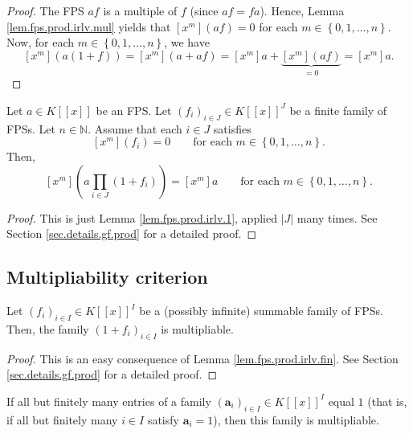 \begin{proof}
The FPS $af$ is a multiple of $f$ (since $af=fa$). Hence, Lemma
\ref{lem.fps.prod.irlv.mul} yields that
$\left[x^{m}\right]\left(af\right)=0$ for each
$m\in\left\{0,1,\ldots,n\right\}$.
Now, for each $m\in\left\{0,1,\ldots,n\right\}$, we have
\[
\left[x^{m}\right]\left(a\left(1+f\right)\right)
=\left[x^{m}\right]\left(a+af\right)
=\left[x^{m}\right]a+\underbrace{\left[x^{m}\right]\left(af\right)}_{=0}
=\left[x^{m}\right]a.
\]
\end{proof}

\begin{lemma}
\label{lem.fps.prod.irlv.fin}
\leantarget
\leanok
Let $a\in K\left[\left[x\right]\right]$ be an FPS. Let $\left(f_{i}\right)_{i\in J}
\in K\left[\left[x\right]\right]^{J}$ be a finite family of FPSs. Let
$n\in\mathbb{N}$. Assume that each $i\in J$ satisfies
\[
\left[x^{m}\right]\left(f_{i}\right)=0 \qquad\text{for each }
m\in\left\{0,1,\ldots,n\right\}.
\]
Then,
\[
\left[x^{m}\right]\left(a\prod_{i\in J}\left(1+f_{i}\right)\right)
=\left[x^{m}\right]a \qquad\text{for each }m\in\left\{0,1,\ldots,n\right\}.
\]
\end{lemma}

\begin{proof}
This is just Lemma \ref{lem.fps.prod.irlv.1}, applied $\left|J\right|$ many
times. See Section \ref{sec.details.gf.prod} for a
detailed proof.
\end{proof}

\subsection{Multipliability criterion}

\begin{theorem}
\label{thm.fps.1+f-mulable}
\leantarget
\leanok
Let $\left(f_{i}\right)_{i\in I}\in K\left[\left[x\right]\right]^{I}$ be a
(possibly infinite) summable family of FPSs. Then, the family
$\left(1+f_{i}\right)_{i\in I}$ is multipliable.
\end{theorem}

\begin{proof}
\leanok
This is an easy consequence of Lemma \ref{lem.fps.prod.irlv.fin}. See Section
\ref{sec.details.gf.prod} for a detailed proof.
\end{proof}

\begin{proposition}
\label{prop.fps.1-mulable}
\leantarget
\leanok
If all but finitely many entries of a family
$\left(\mathbf{a}_{i}\right)_{i\in I}\in K\left[\left[x\right]\right]^{I}$
equal $1$ (that is, if all but finitely many $i\in I$ satisfy
$\mathbf{a}_{i}=1$), then this family is multipliable.
\end{proposition}

